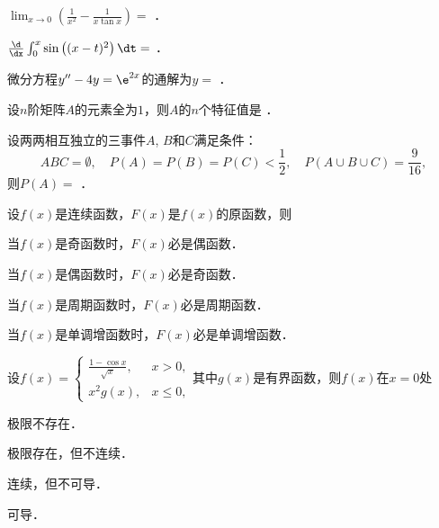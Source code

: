 \documentclass[plain,noanswer,medmath]{../../template/jnuexam}
\begin{document}




\begin{problem}
$\lim_{x \to 0} \left(\frac{1}{x^2} - \frac{1}{x\tan x} \right) =$ \fillin{}．
\end{problem}


\begin{problem}
$\frac{\d}{\dx}\int_0^x \sin \left((x - t)^2 \right)\dt =$ \fillin{}．
\end{problem}


\begin{problem}
微分方程$y''-4y=\e^{2x}$的通解为$y =$ \fillin{}．
\end{problem}


\begin{problem}
设$n$阶矩阵$A$的元素全为$1$，则$A$的$n$个特征值是 \fillin{}．
\end{problem}


\begin{problem}
设两两相互独立的三事件$A$, $B$和$C$满足条件：
$$ABC = \emptyset ,\quad P(A) = P(B) = P(C) < \frac{1}{2},\quad P(A \cup B \cup C) = \frac{9}{16},$$
则$P(A) =$ \fillin{}．
\end{problem}




\begin{problem}
设$f(x)$是连续函数，$F(x)$是$f(x)$的原函数，则\pickout{}
\begin{abcd}
\item 当$f(x)$是奇函数时，$F(x)$必是偶函数．
\item 当$f(x)$是偶函数时，$F(x)$必是奇函数．
\item 当$f(x)$是周期函数时，$F(x)$必是周期函数．
\item 当$f(x)$是单调增函数时，$F(x)$必是单调增函数．
\end{abcd}
\end{problem}


\begin{problem}
设$f(x) = \begin{cases}
  \frac{1 - \cos x}{\sqrt{x}}, & x > 0, \\
  x^2 g(x), & x \le 0,
\end{cases}$其中$g(x)$是有界函数，则$f(x)$在$x = 0$处\pickout{}
\begin{abcd}
\item 极限不存在．
\item 极限存在，但不连续．
\item 连续，但不可导．
\item 可导．
\end{abcd}
\end{problem}
\end{document}
